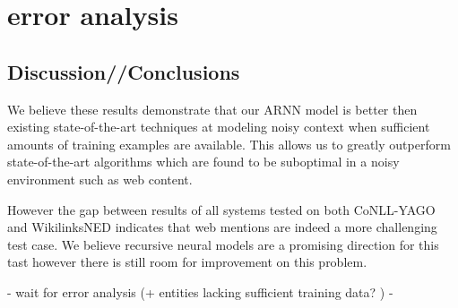 \documentclass[11pt]{article}
\begin{document}
\section{error analysis}

\subsection{Discussion//Conclusions}
We believe these results demonstrate that our ARNN model is better then existing state-of-the-art techniques at modeling noisy context when sufficient amounts of training examples are available. This allows us to greatly outperform state-of-the-art algorithms which are found to be suboptimal in a noisy environment such as web content. 

However the gap between results of all systems tested on both CoNLL-YAGO and WikilinksNED indicates that web mentions are indeed a more challenging test case. We believe recursive neural models are a promising direction for this tast however there is still room for improvement on this problem. 

- wait for error analysis (+ entities lacking sufficient training data? ) -



\end{document}
